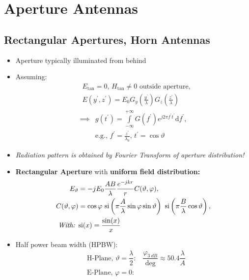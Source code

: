 \section{Aperture Antennas}
\subsection{Rectangular Apertures, Horn Antennas}
\begin{itemize}
    \itemsep0pt
    \item Aperture typically illuminated from behind
    \item Assuming:
        \begin{align*}
            &E_{\mathrm{tan}} = 0 \text{, } H_{\mathrm{tan}} \neq 0 \text{ outside aperture,}\\
            &E(y^\prime, z^\prime) = E_0 G_y\left(\frac{y^\prime}{\lambda}\right) G_z\left(\frac{z^\prime}{\lambda}\right)
        \end{align*}
        \begin{align*}
            \implies& g(t^\prime) = \int\limits^{+\infty}_{-\infty} G(f^\prime) e^{j2\pi f^\prime t^\prime} \mathrm{d}f^\prime,\\
            &\text{e.g., } f^\prime = \frac{z^\prime}{\lambda_0} \text{, } t^\prime = \cos\vartheta
        \end{align*}
    \item \textit{Radiation pattern is obtained by Fourier Transform of aperture distribution!}
    \item \textbf{Rectangular Aperture} with \textbf{uniform field distribution:}
        \begin{align*}
            E_{\vartheta} &= -jE_0 \dfrac{AB}{\lambda} \dfrac{e^{-jkr}}{r} C(\vartheta, \varphi),\\
            C(\vartheta, \varphi) &= \cos\varphi\
            \mathrm{si}\left(\pi \dfrac{A}{\lambda}\sin\varphi\sin\vartheta\right)\
            \mathrm{si}\left(\pi \dfrac{B}{\lambda}\cos\vartheta\right),\\
            \text{\textit{With: }}&\mathrm{si}(x) = \dfrac{\sin(x)}{x}
        \end{align*}
    \item Half power beam width (HPBW):
        \begin{align*}
            &\text{H-Plane, } \vartheta = \dfrac{\lambda}{2} \text{:}\
            &\dfrac{\varphi_{\SI{3}{dB}}}{\mathrm{deg}} \approx 50.4 \dfrac{\lambda}{A}\\
            &\text{E-Plane, } \varphi = 0 \text{:}\

\end{align*}
\end{itemize}
